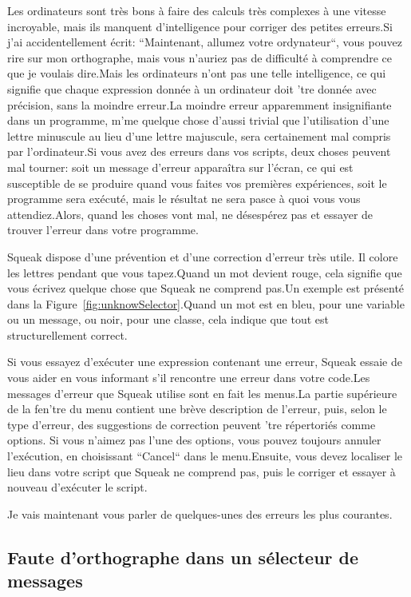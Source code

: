 \documentclass[a4paper,10pt,twoside]{book}
\begin{document}
Les ordinateurs sont tr\`es bons \`a faire des calculs tr\`es complexes \`a une vitesse incroyable, mais ils manquent d'intelligence pour corriger des petites erreurs.Si j'ai accidentellement \'ecrit: ``Maintenant, allumez votre ordynateur``, vous pouvez rire sur mon orthographe, mais vous n'auriez pas de difficult\'e \`a comprendre ce que je voulais dire.Mais les ordinateurs n'ont pas une telle intelligence, ce qui signifie que chaque expression donn\'ee \`a un ordinateur doit 'tre donn\'ee avec pr\'ecision, sans la moindre erreur.La moindre erreur apparemment insignifiante dans un programme, m'me quelque chose d'aussi trivial que l'utilisation d'une lettre minuscule au lieu d'une lettre majuscule, sera certainement mal compris par l'ordinateur.Si vous avez des erreurs dans vos scripts, deux choses peuvent mal tourner: soit un message d'erreur appara\^itra sur l'\'ecran, ce qui est susceptible de se produire quand vous faites vos premi\`eres exp\'eriences, soit le programme sera ex\'ecut\'e, mais le r\'esultat ne sera pasce \`a quoi vous vous attendiez.Alors, quand les choses vont mal, ne d\'esesp\'erez pas et essayer de trouver l'erreur dans votre programme.

Squeak dispose d'une  pr\'evention et d'une correction d'erreur tr\`es utile. Il colore les lettres pendant que vous tapez.Quand un mot devient rouge, cela signifie que vous \'ecrivez quelque chose que Squeak ne comprend pas.Un exemple est pr\'esent\'e dans la Figure~\ref{fig:unknowSelector}.Quand un mot est en bleu, pour une variable ou un message, ou noir, pour une classe, cela indique que tout est structurellement correct.

Si vous essayez d'ex\'ecuter une expression contenant une erreur, Squeak essaie de vous aider en vous informant s'il rencontre une erreur dans votre code.Les messages d'erreur que Squeak utilise sont en fait les menus.La partie sup\'erieure de la fen'tre du menu contient une br\`eve description de l'erreur, puis, selon le type d'erreur, des suggestions de correction peuvent 'tre r\'epertori\'es comme options. Si vous n'aimez pas l'une des options, vous pouvez toujours annuler l'ex\'ecution, en choisissant ``Cancel`` dans le menu.Ensuite, vous devez localiser le lieu dans votre script que Squeak ne comprend pas, puis le corriger et essayer \`a nouveau d'ex\'ecuter le script.

Je vais maintenant vous parler de quelques-unes des erreurs les plus courantes.

\subsection{Faute d'orthographe dans un s\'electeur de messages}
\end{document}
